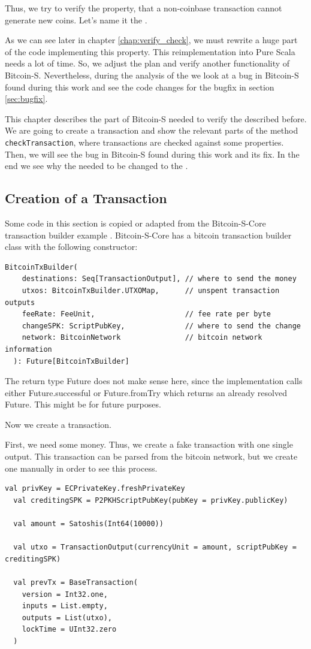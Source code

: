 \documentclass[runningheads]{llncs}
\begin{document}
Thus, we try to verify the property, that a non-coinbase transaction
cannot generate new coins.  Let's name it the .

As we can see later in chapter \ref{chap:verify_check}, we must
rewrite a huge part of the code implementing this property.  This
reimplementation into Pure Scala needs a lot of time.  So, we adjust
the plan and verify another functionality of Bitcoin-S.  Nevertheless,
during the analysis of the  we look at a bug in
Bitcoin-S found during this work and see the code changes for the
bugfix in section \ref{sec:bugfix}.


This chapter describes the part of Bitcoin-S needed to verify the
 described before.  We are going to create a
transaction and show the relevant parts of the method
\texttt{checkTransaction}, where transactions are checked against some
properties.  Then, we will see the bug in Bitcoin-S found during this
work and its fix.  In the end we see why the 
needed to be changed to the .


\subsection{Creation of a Transaction}

Some code in this section is copied or adapted from the Bitcoin-S-Core
transaction builder example \cite{BitcoinSCore:txbuilderexample}.
Bitcoin-S-Core has a bitcoin transaction builder class with the
following constructor:
\begin{lstlisting}[style=scala, basicstyle=\scriptsize\tt]
  BitcoinTxBuilder(
    destinations: Seq[TransactionOutput], // where to send the money
    utxos: BitcoinTxBuilder.UTXOMap,      // unspent transaction outputs
    feeRate: FeeUnit,                     // fee rate per byte
    changeSPK: ScriptPubKey,              // where to send the change
    network: BitcoinNetwork               // bitcoin network information
  ): Future[BitcoinTxBuilder]
\end{lstlisting}

The return type Future does not make sense here, since the
implementation calls either Future.successful or Future.fromTry which
returns an already resolved Future.  This might be for future
purposes.

Now we create a transaction.

First, we need some money.  Thus, we create a fake transaction with
one single output.  This transaction can be parsed from the bitcoin
network, but we create one manually in order to see this process.
\begin{lstlisting}[style=scala]
  val privKey = ECPrivateKey.freshPrivateKey
  val creditingSPK = P2PKHScriptPubKey(pubKey = privKey.publicKey)

  val amount = Satoshis(Int64(10000))

  val utxo = TransactionOutput(currencyUnit = amount, scriptPubKey = creditingSPK)

  val prevTx = BaseTransaction(
    version = Int32.one,
    inputs = List.empty,
    outputs = List(utxo),
    lockTime = UInt32.zero
  )
\end{lstlisting}
\end{document}
